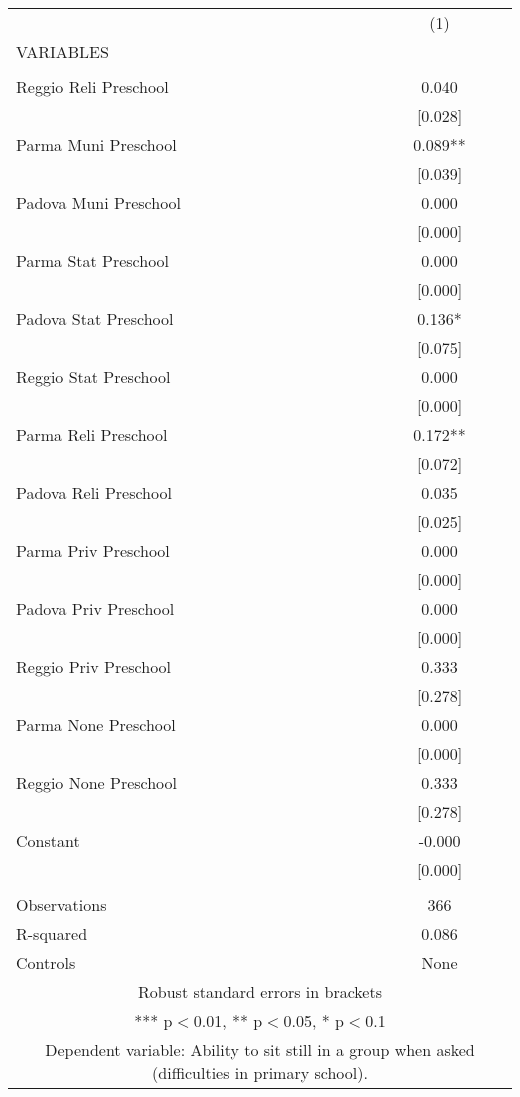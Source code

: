 \begin{tabular}{lc} \hline
 & (1) \\
VARIABLES &  \\ \hline
 &  \\
Reggio Reli Preschool & 0.040 \\
 & [0.028] \\
Parma Muni Preschool & 0.089** \\
 & [0.039] \\
Padova Muni Preschool & 0.000 \\
 & [0.000] \\
Parma Stat Preschool & 0.000 \\
 & [0.000] \\
Padova Stat Preschool & 0.136* \\
 & [0.075] \\
Reggio Stat Preschool & 0.000 \\
 & [0.000] \\
Parma Reli Preschool & 0.172** \\
 & [0.072] \\
Padova Reli Preschool & 0.035 \\
 & [0.025] \\
Parma Priv Preschool & 0.000 \\
 & [0.000] \\
Padova Priv Preschool & 0.000 \\
 & [0.000] \\
Reggio Priv Preschool & 0.333 \\
 & [0.278] \\
Parma None Preschool & 0.000 \\
 & [0.000] \\
Reggio None Preschool & 0.333 \\
 & [0.278] \\
Constant & -0.000 \\
 & [0.000] \\
 &  \\
Observations & 366 \\
R-squared & 0.086 \\
 Controls & None \\ \hline
\multicolumn{2}{c}{ Robust standard errors in brackets} \\
\multicolumn{2}{c}{ *** p$<$0.01, ** p$<$0.05, * p$<$0.1} \\
\multicolumn{2}{c}{ Dependent variable: Ability to sit still in a group when asked (difficulties in primary school).} \\
\end{tabular}
